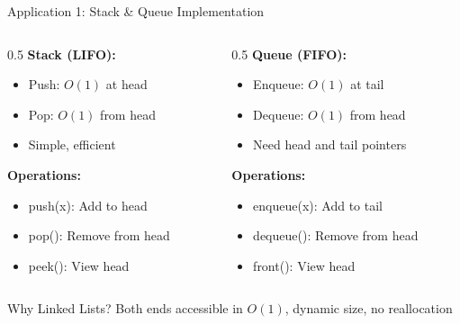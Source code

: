 \documentclass[aspectratio=169,xcolor=dvipsnames]{beamer}
\begin{document}
\begin{frame}{Application 1: Stack \& Queue Implementation}
  \begin{columns}
    \begin{column}{0.5\textwidth}
      \textbf{Stack (LIFO):}
      \begin{itemize}
        \item Push: $O(1)$ at head
        \item Pop: $O(1)$ from head
        \item Simple, efficient
      \end{itemize}

      \vspace{0.3cm}
      \textbf{Operations:}
      \begin{itemize}
        \item push(x): Add to head
        \item pop(): Remove from head
        \item peek(): View head
      \end{itemize}
    \end{column}

    \begin{column}{0.5\textwidth}
      \textbf{Queue (FIFO):}
      \begin{itemize}
        \item Enqueue: $O(1)$ at tail
        \item Dequeue: $O(1)$ from head
        \item Need head and tail pointers
      \end{itemize}

      \vspace{0.3cm}
      \textbf{Operations:}
      \begin{itemize}
        \item enqueue(x): Add to tail
        \item dequeue(): Remove from head
        \item front(): View head
      \end{itemize}
    \end{column}
  \end{columns}

  \vspace{0.3cm}
  \begin{block}{Why Linked Lists?}
    Both ends accessible in $O(1)$, dynamic size, no reallocation
  \end{block}
\end{frame}
\end{document}
